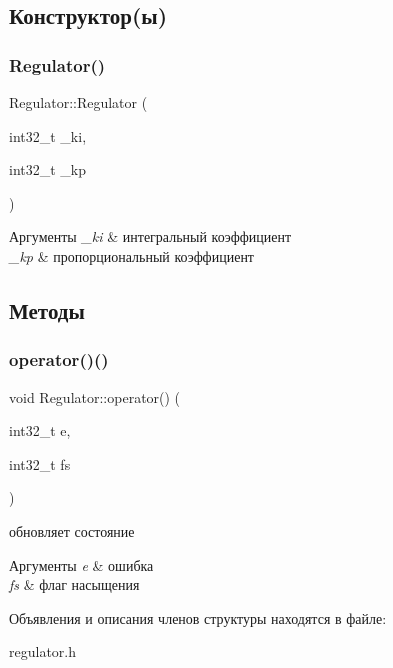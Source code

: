 \subsection{Конструктор(ы)}
\mbox{\label{structRegulator_a5e0dcb7d86f99631d5e64c9def236e12}} 
\subsubsection{\texorpdfstring{Regulator()}{Regulator()}}
{\footnotesize\ttfamily Regulator\+::\+Regulator (\begin{DoxyParamCaption}\item[{int32\+\_\+t}]{\+\_\+ki,  }\item[{int32\+\_\+t}]{\+\_\+kp }\end{DoxyParamCaption})\hspace{0.3cm}{\ttfamily [inline]}}


\begin{DoxyParams}{Аргументы}
{\em \+\_\+ki} & интегральный коэффициент \\
\hline
{\em \+\_\+kp} & пропорциональный коэффициент \\
\hline
\end{DoxyParams}


\subsection{Методы}
\mbox{\label{structRegulator_a13fa9ed0cb46e28c80b2ec229bd7b67a}} 
\subsubsection{\texorpdfstring{operator()()}{operator()()}}
{\footnotesize\ttfamily void Regulator\+::operator() (\begin{DoxyParamCaption}\item[{int32\+\_\+t}]{e,  }\item[{int32\+\_\+t}]{fs }\end{DoxyParamCaption})\hspace{0.3cm}{\ttfamily [inline]}}



обновляет состояние 


\begin{DoxyParams}{Аргументы}
{\em e} & ошибка \\
\hline
{\em fs} & флаг насыщения \\
\hline
\end{DoxyParams}


Объявления и описания членов структуры находятся в файле\+:\begin{DoxyCompactItemize}
\item 
regulator.\+h\end{DoxyCompactItemize}
